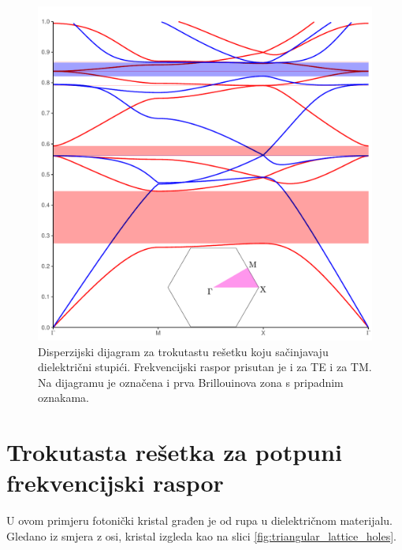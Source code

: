 \documentclass[utf8, seminar]{fer}
\begin{document}
\begin{figure}[ht]
	\centering
	\includegraphics[width = 1.0\linewidth]{./images/triangular.pdf}
	\caption{Disperzijski dijagram za trokutastu rešetku koju sačinjavaju
	dielektrični stupići. Frekvencijski raspor prisutan je i za TE i za TM. Na
	dijagramu je označena i prva Brillouinova zona s pripadnim oznakama.}
	\label{fig:triangular_band_diagram}
\end{figure}

\FloatBarrier

\section {Trokutasta rešetka za potpuni frekvencijski raspor}

U ovom primjeru fotonički kristal građen je od rupa u dielektričnom materijalu.
Gledano iz smjera z osi, kristal izgleda kao na slici
\ref{fig:triangular_lattice_holes}.
\end{document}
